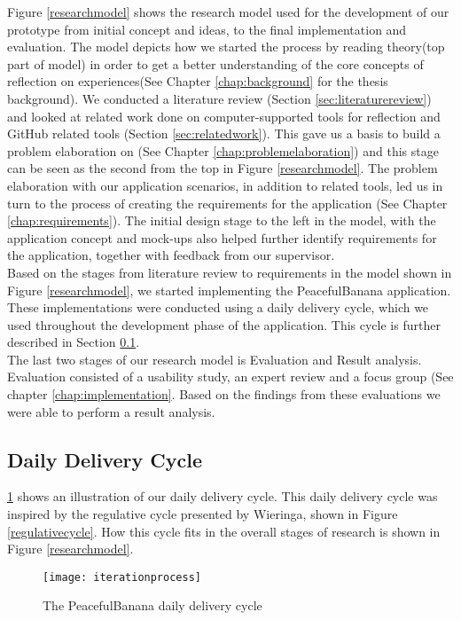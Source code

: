 Figure \ref{researchmodel} shows the research model used for the development of our prototype from initial concept and ideas, to the final implementation and evaluation. The model depicts how we started the process by reading theory(top part of model) in order to get a better understanding of the core concepts of reflection on experiences(See Chapter \ref{chap:background} for the thesis background). We conducted a literature review (Section \ref{sec:literaturereview}) and looked at related work done on computer-supported tools for reflection and GitHub related tools (Section \ref{sec:relatedwork}). This gave us a basis to build a problem elaboration on (See Chapter \ref{chap:problemelaboration}) and this stage can be seen as the second from the top in Figure \ref{researchmodel}. The problem elaboration with our application scenarios, in addition to related tools, led us in turn to the process of creating the requirements for the application (See Chapter \ref{chap:requirements}). The initial design stage to the left in the model, with the application concept and mock-ups also helped further identify requirements for the application, together with feedback from our supervisor. \\
Based on the stages from literature review to requirements in the model shown in Figure \ref{researchmodel}, we started implementing the PeacefulBanana application. These implementations were conducted using a daily delivery cycle, which we used throughout the development phase of the application. This cycle is further described in Section \ref{sec:dailydeliverycycle}. \\
The last two stages of our research model is Evaluation and Result analysis. Evaluation consisted of a usability study, an expert review and a focus group (See chapter \ref{chap:implementation}. Based on the findings from these evaluations we were able to perform a result analysis. 

\subsection{Daily Delivery Cycle}
\label{sec:dailydeliverycycle}

 \ref{iterationprocess} shows an illustration of our daily delivery cycle. This daily delivery cycle was inspired by the regulative cycle presented by Wieringa\citep{wieringa}, shown in Figure \ref{regulativecycle}. How this cycle fits in the overall stages of research is shown in Figure \ref{researchmodel}.
\begin{figure}[!htpb]
\centering
	\texttt{[image: iterationprocess]}
\caption{The PeacefulBanana daily delivery cycle}
\label{iterationprocess}
\end{figure}

